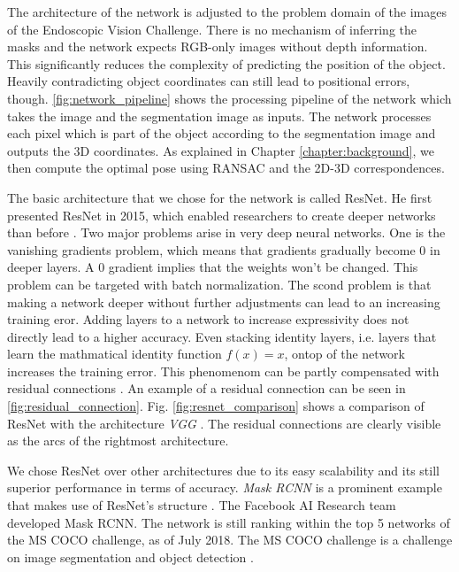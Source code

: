 The architecture of the network is adjusted to the problem domain of the images of the Endoscopic Vision Challenge. There is no mechanism of inferring the masks and the network expects RGB-only images without depth information. This significantly reduces the complexity of predicting the position of the object. Heavily contradicting object coordinates can still lead to positional errors, though. \fig \ref{fig:network_pipeline} shows the processing pipeline of the network which takes the image and the segmentation image as inputs. The network processes each pixel which is part of the object according to the segmentation image and outputs the 3D coordinates. As explained in Chapter \ref{chapter:background}, we then compute the optimal pose using RANSAC and the 2D-3D correspondences.

The basic architecture that we chose for the network is called ResNet. He \etal first presented ResNet in 2015, which enabled researchers to create deeper networks than before \cite{resnet}. Two major problems arise in very deep neural networks. One is the vanishing gradients problem, which means that gradients gradually become 0 in deeper layers. A 0 gradient implies that the weights won't be changed. This problem can be targeted with batch normalization. The scond problem is that making a network deeper without further adjustments can lead to an increasing training eror. Adding layers to a network to increase expressivity does not directly lead to a higher accuracy. Even stacking identity layers, i.e. layers that learn the mathmatical identity function $f(x) = x$, ontop of the network increases the training error. This phenomenom can be partly compensated with residual connections \cite{resnet}. An example of a residual connection can be seen in \fig \ref{fig:residual_connection}. Fig. \ref{fig:resnet_comparison} shows a comparison of ResNet with the architecture \textit{VGG} \cite{vgg}. The residual connections are clearly visible as the arcs of the rightmost architecture.

We chose ResNet over other architectures due to its easy scalability and its still superior performance in terms of accuracy. \textit{Mask RCNN} is a prominent example that makes use of ResNet's structure \cite{mask_rcnn}. The Facebook AI Research team developed Mask RCNN. The network is still ranking within the top 5 networks of the MS COCO challenge, as of July 2018. The MS COCO challenge is a challenge on image segmentation and object detection \cite{mscoco}.

